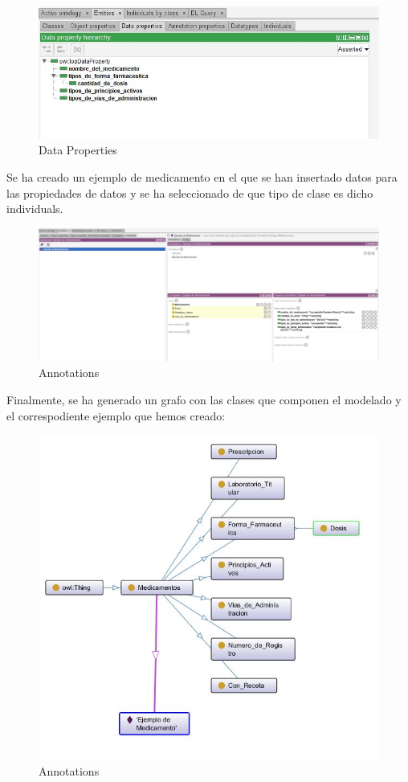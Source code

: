 \documentclass[../main.tex]{subfiles}
\begin{document}
\begin{figure}[h]
    \centering
    \includegraphics[scale=0.7]{images/protege-DataProperties.jpeg}
    \caption{Data Properties}
    \label{fig:mesh1}
\end{figure}

\vspace{2cm}
Se ha creado un ejemplo de medicamento en el que se han insertado datos para las propiedades de datos y se ha seleccionado de que tipo de clase es dicho individuals. \\

\begin{figure}[h]
    \centering
    \includegraphics[scale=0.4]{images/protege-Annotations.jpeg}
    \caption{Annotations}
    \label{fig:mesh1}
\end{figure}

\vspace{1cm}
Finalmente, se ha generado un grafo con las clases que componen el modelado y el correspodiente ejemplo que hemos creado: \\

\begin{figure}[h]
    \centering
    \includegraphics[scale=0.4]{images/protege-Grafo.jpeg}   \caption{Annotations}
    \label{fig:mesh1}
\end{figure}
\end{document}
